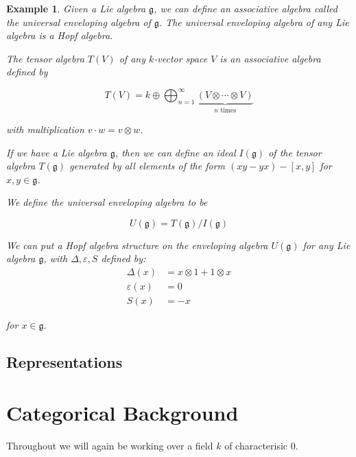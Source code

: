 \documentclass[]{article}
\newtheorem{example}[theorem]{Example}
\numberwithin{equation}{subsection}
\begin{document}
\begin{example}
    \label{UnivEnvAlg}
    Given a Lie algebra $\mathfrak{g}$, we can define an associative algebra
    called the \emph{universal enveloping algebra} of $\mathfrak{g}$. The
    universal enveloping algebra of any Lie algebra is a Hopf algebra.

    The \emph{tensor algebra} $T(V)$ of any $k$-vector space $V$ is an associative
    algebra defined by

    \begin{equation}
        T(V) = k \oplus \bigoplus_{n=1}^\infty \underbrace{(V \otimes \cdots \otimes V)}_{\text{$n$ times}}
    \end{equation}

    with multiplication $v \cdot w = v \otimes w$.


    If we have a Lie algebra $\mathfrak{g}$, then we can define an ideal
    $I(\mathfrak{g})$ of the tensor algebra $T(\mathfrak{g})$ generated by all
    elements of the form $(xy - yx) - \left[ x,y \right]$ for $x,y \in
    \mathfrak{g}$.

    We define the universal enveloping algebra to be 

    \begin{equation}
        U(\mathfrak{g}) = T(\mathfrak{g}) / I(\mathfrak{g})
    \end{equation}

    We can put a Hopf algebra structure on the enveloping algebra
    $U(\mathfrak{g})$ for any Lie algebra $\mathfrak{g}$, with $\Delta,
    \varepsilon, S$ defined by: 
    \begin{align}
        \Delta(x) &= x \otimes 1 + 1 \otimes x \\
        \varepsilon(x) &= 0 \\
        S(x) &= -x  
    \end{align}

    for $x \in \mathfrak{g}$.

\end{example}
\subsection{Representations}

\section{Categorical Background}
Throughout we will again be working over a field $k$ of characterisic 0.
\end{document}
